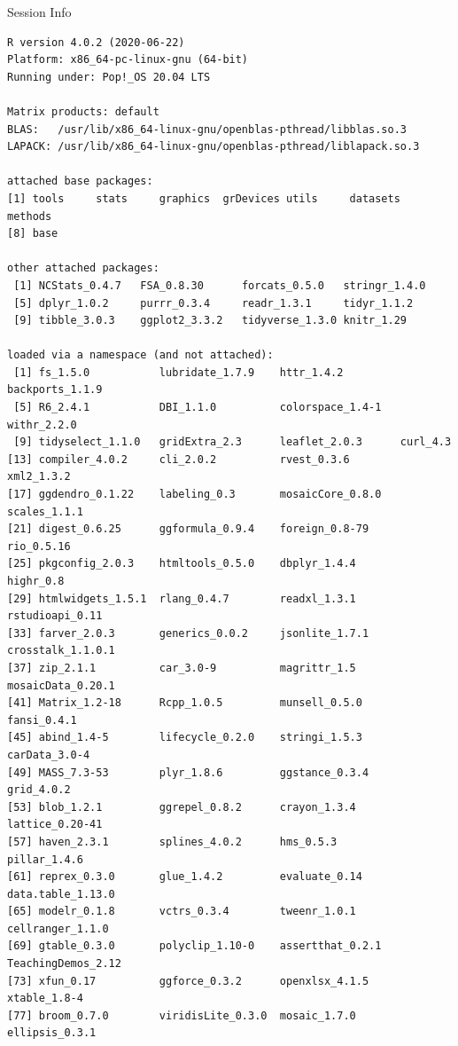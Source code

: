 \documentclass[10pt,handout]{beamer}\usepackage[]{graphicx}\usepackage[]{color}
\makeatletter
\newenvironment{kframe}{%
 \def\at@end@of@kframe{}%
 \ifinner\ifhmode%
  \def\at@end@of@kframe{\end{minipage}}%
  \begin{minipage}{\columnwidth}%
 \fi\fi%
 \def\FrameCommand##1{\hskip\@totalleftmargin \hskip-\fboxsep
 \colorbox{shadecolor}{##1}\hskip-\fboxsep
     \hskip-\linewidth \hskip-\@totalleftmargin \hskip\columnwidth}%
 \MakeFramed {\advance\hsize-\width
   \@totalleftmargin\z@ \linewidth\hsize
   \@setminipage}}%
 {\par\unskip\endMakeFramed%
 \at@end@of@kframe}
\newenvironment{knitrout}{}{} %
\makeatother
\begin{document}
\begin{frame}[fragile]{Session Info}
	\tiny
	
\begin{knitrout}\tiny
{}\color{fgcolor}\begin{kframe}
\begin{verbatim}
R version 4.0.2 (2020-06-22)
Platform: x86_64-pc-linux-gnu (64-bit)
Running under: Pop!_OS 20.04 LTS

Matrix products: default
BLAS:   /usr/lib/x86_64-linux-gnu/openblas-pthread/libblas.so.3
LAPACK: /usr/lib/x86_64-linux-gnu/openblas-pthread/liblapack.so.3

attached base packages:
[1] tools     stats     graphics  grDevices utils     datasets  methods  
[8] base     

other attached packages:
 [1] NCStats_0.4.7   FSA_0.8.30      forcats_0.5.0   stringr_1.4.0  
 [5] dplyr_1.0.2     purrr_0.3.4     readr_1.3.1     tidyr_1.1.2    
 [9] tibble_3.0.3    ggplot2_3.3.2   tidyverse_1.3.0 knitr_1.29     

loaded via a namespace (and not attached):
 [1] fs_1.5.0           lubridate_1.7.9    httr_1.4.2         backports_1.1.9   
 [5] R6_2.4.1           DBI_1.1.0          colorspace_1.4-1   withr_2.2.0       
 [9] tidyselect_1.1.0   gridExtra_2.3      leaflet_2.0.3      curl_4.3          
[13] compiler_4.0.2     cli_2.0.2          rvest_0.3.6        xml2_1.3.2        
[17] ggdendro_0.1.22    labeling_0.3       mosaicCore_0.8.0   scales_1.1.1      
[21] digest_0.6.25      ggformula_0.9.4    foreign_0.8-79     rio_0.5.16        
[25] pkgconfig_2.0.3    htmltools_0.5.0    dbplyr_1.4.4       highr_0.8         
[29] htmlwidgets_1.5.1  rlang_0.4.7        readxl_1.3.1       rstudioapi_0.11   
[33] farver_2.0.3       generics_0.0.2     jsonlite_1.7.1     crosstalk_1.1.0.1 
[37] zip_2.1.1          car_3.0-9          magrittr_1.5       mosaicData_0.20.1 
[41] Matrix_1.2-18      Rcpp_1.0.5         munsell_0.5.0      fansi_0.4.1       
[45] abind_1.4-5        lifecycle_0.2.0    stringi_1.5.3      carData_3.0-4     
[49] MASS_7.3-53        plyr_1.8.6         ggstance_0.3.4     grid_4.0.2        
[53] blob_1.2.1         ggrepel_0.8.2      crayon_1.3.4       lattice_0.20-41   
[57] haven_2.3.1        splines_4.0.2      hms_0.5.3          pillar_1.4.6      
[61] reprex_0.3.0       glue_1.4.2         evaluate_0.14      data.table_1.13.0 
[65] modelr_0.1.8       vctrs_0.3.4        tweenr_1.0.1       cellranger_1.1.0  
[69] gtable_0.3.0       polyclip_1.10-0    assertthat_0.2.1   TeachingDemos_2.12
[73] xfun_0.17          ggforce_0.3.2      openxlsx_4.1.5     xtable_1.8-4      
[77] broom_0.7.0        viridisLite_0.3.0  mosaic_1.7.0       ellipsis_0.3.1    
\end{verbatim}
\end{kframe}
\end{knitrout}
	
\end{frame}
\end{document}
